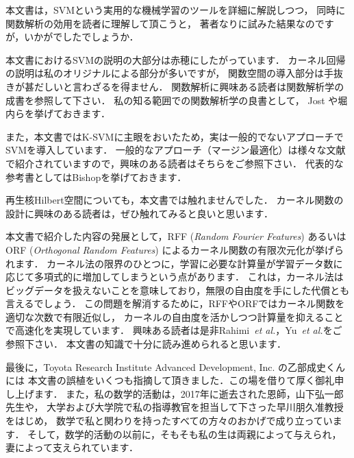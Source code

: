 %

本文書は，SVMという実用的な機械学習のツールを詳細に解説しつつ，
同時に関数解析の効用を読者に理解して頂こうと，
著者なりに試みた結果なのですが，いかがでしたでしょうか．

本文書におけるSVMの説明の大部分は赤穂\cite{Akaho2008}にしたがっています．
カーネル回帰の説明は私のオリジナルによる部分が多いですが，
関数空間の導入部分は手抜きが甚だしいと言わざるを得ません．
関数解析に興味ある読者は関数解析学の成書を参照して下さい．
私の知る範囲での関数解析学の良書として，
Jost \cite{Jost2005}や堀内ら\cite{Horiuchi2005}を挙げておきます．

また，本文書ではK-SVMに主眼をおいたため，実は一般的でないアプローチでSVMを導入しています．
一般的なアプローチ（マージン最適化）は様々な文献で紹介されていますので，興味のある読者はそちらをご参照下さい．
代表的な参考書としてはBishop\cite{Bishop2010}を挙げておきます．

再生核Hilbert空間についても，本文書では触れませんでした．
カーネル関数の設計に興味のある読者は，ぜひ触れてみると良いと思います．

本文書で紹介した内容の発展として，RFF (\textit{Random Fourier Features}) あるいは
ORF (\textit{Orthogonal Random Features}) によるカーネル関数の有限次元化が挙げられます．
カーネル法の限界のひとつに，学習に必要な計算量が学習データ数に応じて多項式的に増加してしまうという点があります．
これは，カーネル法はビッグデータを扱えないことを意味しており，無限の自由度を手にした代償とも言えるでしょう．
この問題を解消するために，RFFやORFではカーネル関数を適切な次数で有限近似し，
カーネルの自由度を活かしつつ計算量を抑えることで高速化を実現しています．
興味ある読者は是非Rahimi~\textit{et al.}\cite{Rahimi2007}，Yu~\textit{et al.}\cite{Yu2016}をご参照下さい．
本文書の知識で十分に読み進められると思います．

最後に，Toyota Research Institute Advanced Development, Inc. の乙部成史くんには
本文書の誤植をいくつも指摘して頂きました．この場を借りて厚く御礼申し上げます．
また，私の数学的活動は，2017年に逝去された恩師，山下弘一郎先生や，
大学および大学院で私の指導教官を担当して下さった早川朋久准教授をはじめ，
数学で私と関わりを持ったすべての方々のおかげで成り立っています．
そして，数学的活動の以前に，そもそも私の生は両親によって与えられ，妻によって支えられています．

